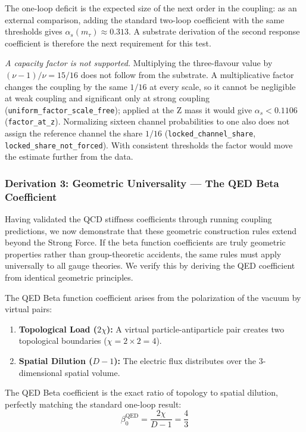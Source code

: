 The one-loop deficit is the expected size of the next order in the coupling: as an external comparison, adding the standard two-loop coefficient with the same thresholds gives $\alpha_s(m_\tau)\approx0.313$. A substrate derivation of the second response coefficient is therefore the next requirement for this test.

\textit{A capacity factor is not supported.} Multiplying the three-flavour value by $(\nu-1)/\nu=15/16$ does not follow from the substrate. A multiplicative factor changes the coupling by the same $1/16$ at every scale, so it cannot be negligible at weak coupling and significant only at strong coupling (\texttt{uniform\_factor\_scale\_free}); applied at the Z mass it would give $\alpha_s<0.1106$ (\texttt{factor\_at\_z}). Normalizing sixteen channel probabilities to one also does not assign the reference channel the share $1/16$ (\texttt{locked\_channel\_share}, \texttt{locked\_share\_not\_forced}). With consistent thresholds the factor would move the estimate further from the data.

\subsubsection{Derivation 3: Geometric Universality --- The QED Beta Coefficient}

Having validated the QCD stiffness coefficients through running coupling predictions, we now demonstrate that these geometric construction rules extend beyond the Strong Force. If the beta function coefficients are truly geometric properties rather than group-theoretic accidents, the same rules must apply universally to all gauge theories. We verify this by deriving the QED coefficient from identical geometric principles.

The QED Beta function coefficient arises from the polarization of the vacuum by virtual pairs:
\begin{enumerate}
    \item \textbf{Topological Load ($2\chi$):} A virtual particle-antiparticle pair creates two topological boundaries ($\chi=2 \times 2 = 4$).
    \item \textbf{Spatial Dilution ($D-1$):} The electric flux distributes over the 3-dimensional spatial volume.
\end{enumerate}

The QED Beta coefficient is the exact ratio of topology to spatial dilution, perfectly matching the standard one-loop result:
\begin{equation}
    \beta_0^{\text{QED}} = \frac{2\chi}{D-1} = \frac{4}{3}
\end{equation}

